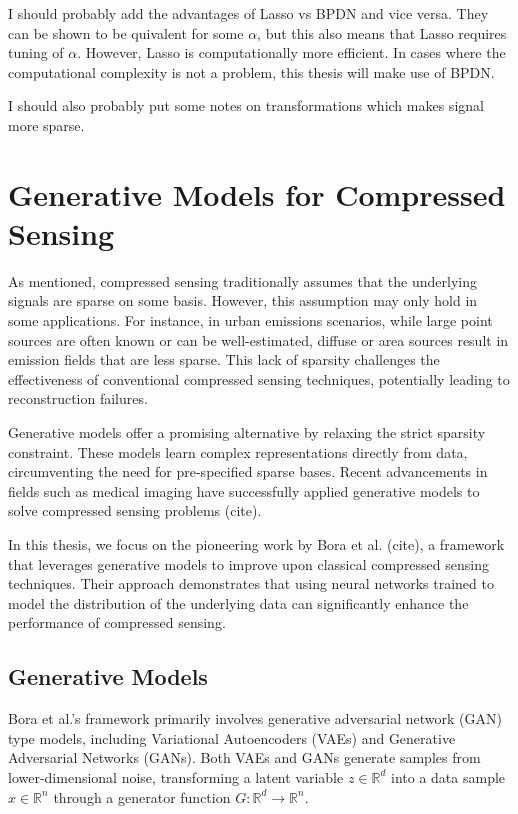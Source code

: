 I should probably add the advantages of Lasso vs BPDN and vice versa.
They can be shown to be quivalent for some $\alpha$, but this also means that Lasso requires tuning of $\alpha$.
However, Lasso is computationally more efficient.
In cases where the computational complexity is not a problem, this thesis will make use of BPDN.

I should also probably put some notes on transformations which makes signal more sparse.

\section{Generative Models for Compressed Sensing}
As mentioned, compressed sensing traditionally assumes that the underlying signals are sparse on some basis.
However, this assumption may only hold in some applications.
For instance, in urban emissions scenarios, while large point sources are often known or can be well-estimated, diffuse or area sources result in emission fields that are less sparse.
This lack of sparsity challenges the effectiveness of conventional compressed sensing techniques, potentially leading to reconstruction failures.

Generative models offer a promising alternative by relaxing the strict sparsity constraint.
These models learn complex representations directly from data, circumventing the need for pre-specified sparse bases.
Recent advancements in fields such as medical imaging have successfully applied generative models to solve compressed sensing problems (cite). %

In this thesis, we focus on the pioneering work by Bora et al. (cite), a framework that leverages generative models to improve upon classical compressed sensing techniques.
Their approach demonstrates that using neural networks trained to model the distribution of the underlying data can significantly enhance the performance of compressed sensing.

\subsection{Generative Models}

Bora et al.'s framework primarily involves generative adversarial network (GAN) type models, including Variational Autoencoders (VAEs) and Generative Adversarial Networks (GANs).
Both VAEs and GANs generate samples from lower-dimensional noise, transforming a latent variable $z \in \mathbb{R}^d$ into a data sample $x \in \mathbb{R}^n$ through a generator function $G: \mathbb{R}^d \to \mathbb{R}^n$.

